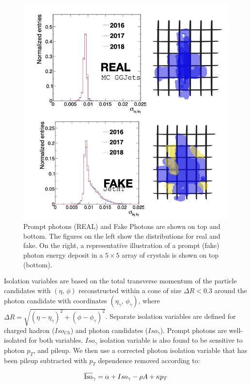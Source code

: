 \begin{figure}[!htb]
	\centering
	\includegraphics[scale=0.9]{fig/PromptPhotonsVsFakes.png}
	\caption{Prompt photons (REAL) and Fake Photons are shown on top and bottom. The figures on the left show the \sieie distributions for real and fake. On the right, a representative illustration of a prompt (fake) photon energy deposit in a $5 \times 5$ array of crystals is shown on top (bottom).}
	\label{fig:PromptPhotonsVsFakes}
\end{figure}

Isolation variables are based on the total transverse momentum of the particle candidates with $(\eta,\,\phi)$ reconstructed within a cone of size $\Delta R < 0.3$ around the photon candidate with coordinates $(\eta_\gamma,\,\phi_\gamma)$, where $\Delta R = \sqrt{(\eta - \eta_\gamma)^2 +(\phi-\phi_\gamma)^2}$. Separate isolation variables are defined for charged hadron ($Iso_{Ch}$) and photon candidates ($Iso_{\gamma}$). Prompt photons are well-isolated for both variables. $Iso_{\gamma}$ isolation variable is also found to be sensitive to photon $p_{T}$, and pileup. We then use a corrected photon isolation variable that has been pileup subtracted with $p_{T}$ dependence removed according to:

\begin{equation}
 \overline{\mbox{Iso}}_\gamma = \alpha + Iso_{\gamma} - \rho A + \kappa p_{T}  
\end{equation}

